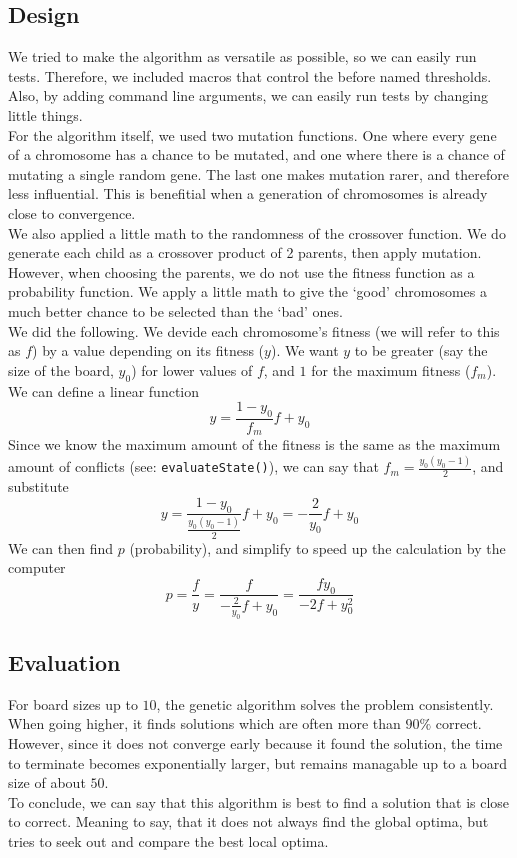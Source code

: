\documentclass{article}
\begin{document}
\subsection*{Design}
We tried to make the algorithm as versatile as possible, so we can easily run tests. Therefore, we included macros that control the before named thresholds. Also, by adding command line arguments, we can easily run tests by changing little things.\\
For the algorithm itself, we used two mutation functions. One where every gene of a chromosome has a chance to be mutated, and one where there is a chance of mutating a single random gene. The last one makes mutation rarer, and therefore less influential. This is benefitial when a generation of chromosomes is already close to convergence.\\
We also applied a little math to the randomness of the crossover function. We do generate each child as a crossover product of 2 parents, then apply mutation. However, when choosing the parents, we do not use the fitness function as a probability function. We apply a little math to give the `good' chromosomes a much better chance to be selected than the `bad' ones.\\
We did the following. We devide each chromosome's fitness (we will refer to this as $f$) by a value depending on its fitness ($y$). We want $y$ to be greater (say the size of the board, $y_0$) for lower values of $f$, and $1$ for the maximum fitness ($f_m$). We can define a linear function
$$ y = \frac{1-y_0}{f_m}f + y_0 $$
Since we know the maximum amount of the fitness is the same as the maximum amount of conflicts (see: \verb|evaluateState()|), we can say that $f_m = \frac{y_0(y_0-1)}{2}$, and substitute
$$ y = \frac{1-y_0}{\frac{y_0(y_0-1)}{2}}f + y_0 = -\frac{2}{y_0}f + y_0 $$
We can then find $p$ (probability), and simplify to speed up the calculation by the computer
$$ p = \frac{f}{y} = \frac{f}{-\frac{2}{y_0}f + y_0} = \frac{fy_0}{-2f+y_0^2} $$
\subsection*{Evaluation}
For board sizes up to $10$, the genetic algorithm solves the problem consistently. When going higher, it finds solutions which are often more than $90\%$ correct. However, since it does not converge early because it found the solution, the time to terminate becomes exponentially larger, but remains managable up to a board size of about $50$.\\
To conclude, we can say that this algorithm is best to find a solution that is close to correct. Meaning to say, that it does not always find the global optima, but tries to seek out and compare the best local optima.
\end{document}
